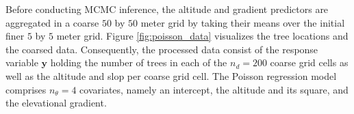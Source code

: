 \documentclass[twoside,11pt]{article}
\begin{document}
Before conducting MCMC inference, the altitude and gradient predictors are aggregated in a coarse $50$ by $50$ meter grid by
taking their means over the initial finer $5$ by $5$ meter grid. Figure \ref{fig:poisson_data} visualizes the tree locations 
and the coarsed data. Consequently, the processed data consist of the response variable $\mathbf{y}$ holding the number of 
trees in each of the $n_d=200$ coarse grid cells as well as the altitude and slop per coarse grid cell. The Poisson 
regression model comprises $n_{\theta}=4$ covariates, namely an intercept, the altitude and its square, and the elevational 
gradient.

\begin{figure}
	\centering
	 \\
	 \\

\end{figure}
\end{document}
